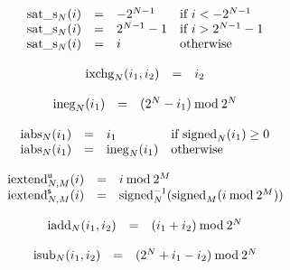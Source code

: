 $$
\begin{array}[t]{@{}lcl@{}l@{}}
{{\mathrm{sat\_s}}}_{N}(i) & = & {-{2^{N - 1}}} & \quad \mbox{if}~ i < {-{2^{N - 1}}} \\
{{\mathrm{sat\_s}}}_{N}(i) & = & {2^{N - 1}} - 1 & \quad \mbox{if}~ i > {2^{N - 1}} - 1 \\
{{\mathrm{sat\_s}}}_{N}(i) & = & i & \quad \mbox{otherwise} \\
\end{array}
$$

\vspace{1ex}

$$
\begin{array}[t]{@{}lcl@{}l@{}}
{{\mathrm{ixchg}}}_{N}(i_1, i_2) & = & i_2 \\
\end{array}
$$

\vspace{1ex}

$$
\begin{array}[t]{@{}lcl@{}l@{}}
{{\mathrm{ineg}}}_{N}(i_1) & = & ({2^{N}} - i_1) \mathbin{\mathrm{mod}} {2^{N}} \\
\end{array}
$$

$$
\begin{array}[t]{@{}lcl@{}l@{}}
{{\mathrm{iabs}}}_{N}(i_1) & = & i_1 & \quad \mbox{if}~ {{\mathrm{signed}}}_{N}(i_1) \geq 0 \\
{{\mathrm{iabs}}}_{N}(i_1) & = & {{\mathrm{ineg}}}_{N}(i_1) & \quad \mbox{otherwise} \\
\end{array}
$$

$$
\begin{array}[t]{@{}lcl@{}l@{}}
{{{{\mathrm{iextend}}}_{N, M}^{\mathsf{u}}}}{(i)} & = & i \mathbin{\mathrm{mod}} {2^{M}} \\
{{{{\mathrm{iextend}}}_{N, M}^{\mathsf{s}}}}{(i)} & = & {{{{\mathrm{signed}}}_{N}^{{-1}}}}{({{\mathrm{signed}}}_{M}(i \mathbin{\mathrm{mod}} {2^{M}}))} \\
\end{array}
$$

\vspace{1ex}

$$
\begin{array}[t]{@{}lcl@{}l@{}}
{{\mathrm{iadd}}}_{N}(i_1, i_2) & = & (i_1 + i_2) \mathbin{\mathrm{mod}} {2^{N}} \\
\end{array}
$$

$$
\begin{array}[t]{@{}lcl@{}l@{}}
{{\mathrm{isub}}}_{N}(i_1, i_2) & = & ({2^{N}} + i_1 - i_2) \mathbin{\mathrm{mod}} {2^{N}} \\
\end{array}
$$

